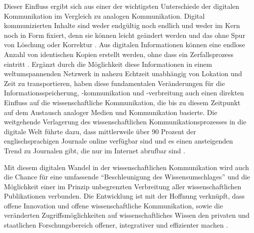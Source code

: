 Dieser Einfluss ergibt sich aus einer der wichtigsten Unterschiede der digitalen Kommunikation im Vergleich zu analogen Kommunikation. Digital kommunizierten Inhalte sind weder endgültig noch endlich und weder im Kern noch in Form fixiert, denn sie können leicht geändert werden und das ohne Spur von Löschung oder Korrektur \cite{smith_1999_digitize}. Aus digitalen Informationen können eine endlose Anzahl von identischen Kopien erstellt werden, ohne dass ein Zerfallsprozess eintritt \cite{smith_1999_digitize}. Ergänzt durch die Möglichkeit diese Informationen in einem weltumspannenden Netzwerk in nahezu Echtzeit unabhängig von Lokation und Zeit zu transportieren, haben diese fundamentalen Veränderungen für die Informationsspeicherung, -kommunikation und -verbreitung auch einen direkten Einfluss auf die wissenschaftliche Kommunikation, die bis zu diesem Zeitpunkt auf dem Austausch analoger Medien und Kommunikation basierte. Die weitgehende Verlagerung des wissenschaftlichen Kommunikationsprozesses in die digitale Welt führte dazu, dass mittlerweile über 90 Prozent der englischsprachigen Journale online verfügbar sind und es einen ansteigenden Trend zu Journalen gibt, die nur im Internet abrufbar sind \cite{cope2014future}.

Mit diesem digitalen Wandel in der wissenschaftlichen Kommunikation wird auch die Chance für eine umfassende “Beschleunigung des Wissensumschlages” \cite{Wenzel_2003} und die Möglichkeit einer im Prinzip unbegrenzten Verbreitung aller wissenschaftlichen Publikationen \cite{bbaw_publizieren_2015} verbunden. Die Entwicklung ist mit der Hoffnung verknüpft, dass offene Innovation und offene wissenschaftliche Kommunikation, sowie die veränderten Zugriffsmöglichkeiten auf wissenschaftliches Wissen \cite{naeder_2010_open} den privaten und staatlichen Forschungsbereich offener, integrativer und effizienter machen \cite{harmon_2012_commercialization}.

